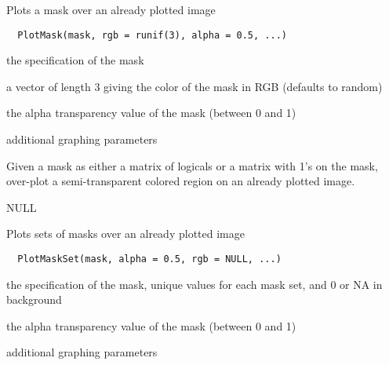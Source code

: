 \documentclass[a4paper]{book}
\begin{document}
%
\begin{Description}\relax
Plots a mask over an already plotted image
\end{Description}
%
\begin{Usage}
\begin{verbatim}
  PlotMask(mask, rgb = runif(3), alpha = 0.5, ...)
\end{verbatim}
\end{Usage}
%
\begin{Arguments}
\begin{ldescription}
\item[\code{mask}] the specification of the mask

\item[\code{rgb}] a vector of length 3 giving the color of the
mask in RGB (defaults to random)

\item[\code{alpha}] the alpha transparency value of the mask
(between 0 and 1)

\item[\code{...}] additional graphing parameters
\end{ldescription}
\end{Arguments}
%
\begin{Details}\relax
Given a mask as either a matrix of logicals or a matrix
with 1's on the mask, over-plot a semi-transparent
colored region on an already plotted image.
\end{Details}
%
\begin{Value}
NULL
\end{Value}
%
\begin{Description}\relax
Plots sets of masks over an already plotted image
\end{Description}
%
\begin{Usage}
\begin{verbatim}
  PlotMaskSet(mask, alpha = 0.5, rgb = NULL, ...)
\end{verbatim}
\end{Usage}
%
\begin{Arguments}
\begin{ldescription}
\item[\code{mask}] the specification of the mask, unique values
for each mask set, and 0 or NA in background

\item[\code{alpha}] the alpha transparency value of the mask
(between 0 and 1)

\item[\code{...}] additional graphing parameters
\end{ldescription}
\end{Arguments}
\end{document}
